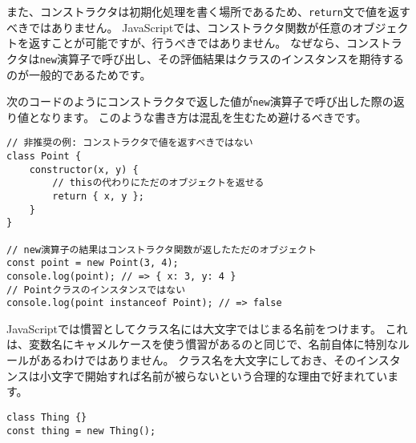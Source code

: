 また、コンストラクタは初期化処理を書く場所であるため、\texttt{return}文で値を返すべきではありません。
JavaScriptでは、コンストラクタ関数が任意のオブジェクトを返すことが可能ですが、行うべきではありません。
なぜなら、コンストラクタは\texttt{new}演算子で呼び出し、その評価結果はクラスのインスタンスを期待するのが一般的であるためです。

次のコードのようにコンストラクタで返した値が\texttt{new}演算子で呼び出した際の返り値となります。
このような書き方は混乱を生むため避けるべきです。

\begin{lstlisting}
// 非推奨の例: コンストラクタで値を返すべきではない
class Point {
    constructor(x, y) {
        // thisの代わりにただのオブジェクトを返せる
        return { x, y };
    }
}

// new演算子の結果はコンストラクタ関数が返したただのオブジェクト
const point = new Point(3, 4);
console.log(point); // => { x: 3, y: 4 }
// Pointクラスのインスタンスではない
console.log(point instanceof Point); // => false
\end{lstlisting}

\begin{note}{}
\hypertarget{class-name-start-upper-case}{%
\underline{}\label{class-name-start-upper-case}}

JavaScriptでは慣習としてクラス名には大文字ではじまる名前をつけます。
これは、変数名にキャメルケースを使う慣習があるのと同じで、名前自体に特別なルールがあるわけではありません。
クラス名を大文字にしておき、そのインスタンスは小文字で開始すれば名前が被らないという合理的な理由で好まれています。

\begin{lstlisting}
class Thing {}
const thing = new Thing();
\end{lstlisting}
\end{note}

